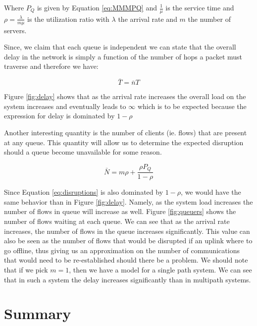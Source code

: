 Where $P_Q$ is given by Equation \ref{eq:MMMPQ} and $\frac{1}{\mu}$ is the
service time and $\rho = \frac{\lambda}{m\mu}$ is the utilization ratio with
$\lambda$ the arrival rate and $m$ the number of servers.

Since, we claim that each queue is independent we can state that the overall
delay in the network is simply a function of the number of hops a packet must
traverse and therefore we have:

\begin{equation}
\bar{T} = \bar{n}T
\label{eq:overallDelay} 
\end{equation}


Figure \ref{fig:delay} shows that as the arrival rate increases the overall
load on the system increases and eventually leads to $\infty$ which is to be
expected because the expression for delay is dominated by $1 - \rho$

Another interesting quantity is the number of clients (ie. flows) that are
present at any queue. This quantity will allow us to determine the expected
disruption should a queue become unavailable for some reason.

\begin{equation}
 \bar{N} = m\rho + \frac{\rho P_{Q}}{1-\rho}
\label{eq:disruptions} 
\end{equation}


Since Equation \ref{eq:disruptions} is also dominated by $1 -\rho$, we would
have the same behavior than in Figure \ref{fig:delay}. Namely, as the system
load increases the number of flows in queue will increase as well. Figure \ref{fig:queuers} shows the number of flows waiting at each queue. We can see that as the arrival rate increases, the number of flows in the queue increases significantly. This value can also be seen as the number of flows that would be disrupted if an uplink where to go offline, thus giving us an approximation on the number of communications that would need to be re-established should there be a problem. We should note that if we pick $m=1$, then we have a model for a single path system. We can see that in such a system the delay increases significantly than in multipath systems.


\section{Summary}

